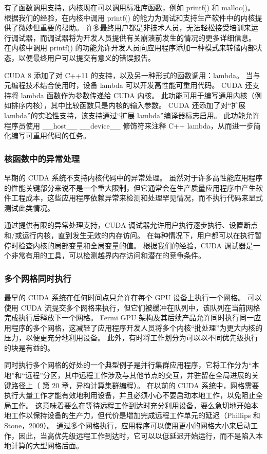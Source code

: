 有了函数调用支持，内核现在可以调用标准库函数，例如 printf() 和 malloc()。 根据我们的经验，在内核中调用 printf() 的能力为调试和支持生产软件中的内核提供了微妙但重要的帮助。 许多最终用户都是非技术人员，无法轻松接受培训来运行调试器，而调试器将为开发人员提供有关崩溃前发生的情况的更多详细信息。 在内核中调用 printf() 的功能允许开发人员向应用程序添加一种模式来转储内部状态，以便最终用户可以提交有意义的错误报告。

CUDA 8 添加了对 C++11 的支持，以及另一种形式的函数调用：lambda。 当与元编程技术结合使用时，设备 lambda 可以开发高性能可重用代码。 CUDA 还支持将 lambda 函数作为参数传递给 CUDA 内核。 此功能可用于编写通用内核（例如排序内核），其中比较函数只是内核的输入参数。 CUDA 还添加了对“扩展 lambda”的实验性支持，该支持通过“扩展 lambda”编译器标志启用。 此功能允许程序员使用 \_\_host\_\_ \_\_device\_\_ 修饰符来注释 C++ lambda，从而进一步简化编写可重用代码的任务。

\subsubsection{核函数中的异常处理}
早期的 CUDA 系统不支持内核代码中的异常处理。 虽然对于许多高性能应用程序的性能关键部分来说不是一个重大限制，但它通常会在生产质量应用程序中产生软件工程成本，这些应用程序依赖异常来检测和处理罕见情况，而不执行代码来显式测试此类情况。

通过提供有限的异常处理支持，CUDA 调试器允许用户执行逐步执行、设置断点和/或运行内核，直到发生无效的内存访问。 在每种情况下，用户都可以在执行暂停时检查内核的局部变量和全局变量的值。 根据我们的经验，CUDA 调试器是一个非常有用的工具，可以检测越界内存访问和潜在的竞争条件。

\subsubsection{多个网格同时执行}
最早的 CUDA 系统在任何时间点只允许在每个 GPU 设备上执行一个网格。 可以使用 CUDA 流提交多个网格来执行，但它们被缓冲在队列中，该队列在当前网格完成执行后释放下一个网格。 Fermi GPU 架构及其后续产品允许同时执行同一应用程序的多个网格，这减轻了应用程序开发人员将多个内核“批处理”为更大内核的压力，以便更充分地利用设备。 此外，有时将工作划分为可以以不同优先级执行的块是有益的。

同时执行多个网格的好处的一个典型例子是并行集群应用程序，它将工作分为“本地”和“远程”分区，其中远程工作涉及与其他节点的交互，并驻留在全局进展的关键路径上（ 第 20 章，异构计算集群编程）。 在以前的 CUDA 系统中，网格需要执行大量工作才能有效地利用设备，并且必须小心不要启动本地工作，以免阻止全局工作。 这意味着要么在等待远程工作到达时充分利用设备，要么急切地开始本地工作以保持设备的生产力，但代价是增加完成远程工作单元的延迟（Phillips 和 Stone，2009）。 通过多个网格执行，应用程序可以使用更小的网格大小来启动工作，因此，当高优先级远程工作到达时，它可以以低延迟开始运行，而不是陷入本地计算的大型网格后面。

